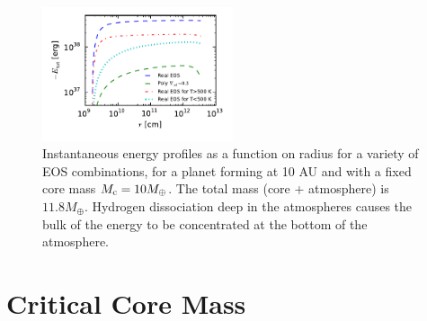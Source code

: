 \documentclass[apj]{emulateapj}
\begin{document}
\begin{figure}[h]
\centering
\includegraphics[width=0.5\textwidth]{../../figs/ModelAtmospheres/RadSelfGravRealEOS/EOSeffects/Er_plot.pdf}
\caption{Instantaneous energy profiles as a function on radius for a variety of EOS combinations, for a planet forming at 10 AU and with a fixed core mass $M_{\rm c}=10 M_{\oplus}$. The total mass (core + atmosphere) is $11.8 M_{\oplus}$. Hydrogen dissociation deep in the atmospheres causes the bulk of the energy to be concentrated at the bottom of the atmosphere.}
\label{fig:Erplot}
\end{figure}







\section{Critical Core Mass}
\label{critical}


\end{document}
